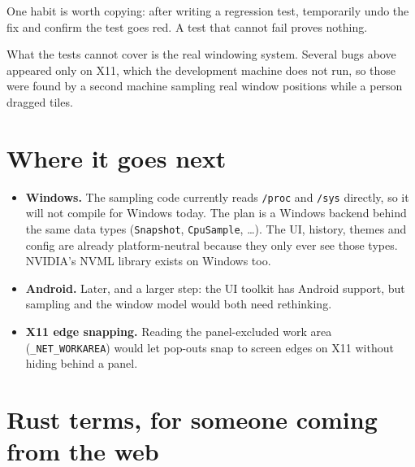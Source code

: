 \documentclass[11pt,a4paper]{article}
\newcommand{\code}[1]{\texttt{#1}}
\newcommand{\file}[1]{\texttt{#1}}
\begin{document}
One habit is worth copying: after writing a regression test, temporarily undo the fix and
confirm the test goes red. A test that cannot fail proves nothing.

What the tests cannot cover is the real windowing system. Several bugs above appeared only on
X11, which the development machine does not run, so those were found by a second machine
sampling real window positions while a person dragged tiles.

\section{Where it goes next}

\begin{itemize}
  \item \textbf{Windows.} The sampling code currently reads \file{/proc} and \file{/sys}
        directly, so it will not compile for Windows today. The plan is a Windows backend
        behind the same data types (\code{Snapshot}, \code{CpuSample}, \dots). The UI, history,
        themes and config are already platform-neutral because they only ever see those types.
        NVIDIA's NVML library exists on Windows too.
  \item \textbf{Android.} Later, and a larger step: the UI toolkit has Android support, but sampling
        and the window model would both need rethinking.
  \item \textbf{X11 edge snapping.} Reading the panel-excluded work area (\code{\_NET\_WORKAREA})
        would let pop-outs snap to screen edges on X11 without hiding behind a panel.
\end{itemize}

\appendix
\section{Rust terms, for someone coming from the web}
\end{document}
